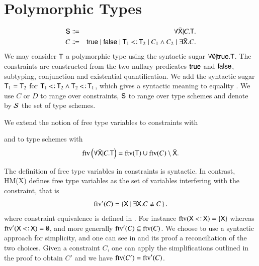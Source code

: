 \documentclass{report}
\begin{document}
  \section{Polymorphic Types}
  \begin{eqnarray}
    \type{S} &\eqg& \forall\bar{\type{X}}|C.\type{T}\textrm{.}\nonumber\\
    C        &\eqg& \true
               \mid \false
               \mid \type{T}_1\subtype\type{T}_2
               \mid C_1 \land C_2
               \mid \exists\bar{\type{X}}.C\textrm{.}\nonumber
  \end{eqnarray}
  We may consider $\textsf{T}$ a polymorphic type using the syntactic sugar
  $\forall\emptyset|\textsf{true}.\textsf{T}$. The constraints are constructed from
  the two nullary predicates $\textsf{true}$ and $\textsf{false}$, subtyping,
  conjunction and existential quantification. We add the syntactic sugar
  $\textsf{T}_1=\textsf{T}_2$ for $\type{T}_1\subtype\type{T}_2\land\type{T}_2\subtype\type{T}_1$,
  which gives a syntactic meaning to equality .
  We use $C$ or $D$ to range over constraints,
  $\textsf{S}$ to range over type schemes and denote by
  $\mathcal{S}$ the set of type schemes.
  \begin{dfn}
    We extend the notion of free type variables to constraints with
    and to type schemes with
    \begin{displaymath}
      \mathop{\rm ftv}\nolimits\left({\forall\bar{\textsf{X}}|C.\textsf{T}}\right)=
        \mathop{\rm ftv}\nolimits(\textsf{T})\cup\mathop{\rm ftv}\nolimits(C)\setminus\bar{\textsf{X}}\textrm{.}
    \end{displaymath}
  \end{dfn}
  The definition of free type variables in constraints is syntactic. In contrast,
  HM(X) \cite{sulzmann97type} defines free type variables as the set of variables
  interfering with the constraint, that is
  \begin{displaymath}
    \ftv'(C) = \coll{\type{X}}{\exists\type{X}.C\nequiv C}\textrm{.}
  \end{displaymath}
  where constraint equivalence is defined in . For instance
  $\ftv(\type{X}\subtype\type{X})=\set{\type{X}}$ whereas $\ftv'(\type{X}\subtype\type{X})=\emptyset$,
  and more generally $\mathop{\rm ftv}\nolimits'(C)\subseteq\mathop{\rm ftv}\nolimits(C)$. We choose to use a syntactic approach for
  simplicity, and one can see in  and its proof a reconciliation of the
  two choices. Given a constraint $C$, one can apply the simplifications outlined in the proof to
  obtain $C'$ and we have $\mathop{\rm ftv}\nolimits(C')=\mathop{\rm ftv}\nolimits'(C)$.
  
\end{document}
